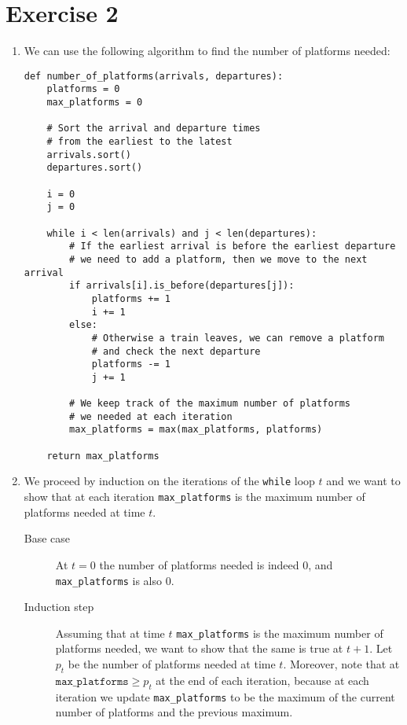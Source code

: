 \documentclass[10pt]{article}
\begin{document}
\section*{Exercise 2}
\begin{enumerate}
    \item We can use the following algorithm to find the number of platforms needed:

          \begin{verbatim}
def number_of_platforms(arrivals, departures):
    platforms = 0
    max_platforms = 0

    # Sort the arrival and departure times
    # from the earliest to the latest
    arrivals.sort()
    departures.sort()

    i = 0
    j = 0

    while i < len(arrivals) and j < len(departures):
        # If the earliest arrival is before the earliest departure
        # we need to add a platform, then we move to the next arrival
        if arrivals[i].is_before(departures[j]): 
            platforms += 1
            i += 1
        else:
            # Otherwise a train leaves, we can remove a platform
            # and check the next departure
            platforms -= 1
            j += 1

        # We keep track of the maximum number of platforms
        # we needed at each iteration
        max_platforms = max(max_platforms, platforms)
    
    return max_platforms
        \end{verbatim}

    \item
          We proceed by induction on the iterations of the \texttt{while} loop $t$ and we want to show that at each iteration \texttt{max\_platforms} is the maximum number of platforms needed at time $t$.

          \begin{description}
              \item[Base case] At $t = 0$ the number of platforms needed is indeed 0, and \texttt{max\_platforms} is also 0.
              \item[Induction step] Assuming that at time $t$ \texttt{max\_platforms} is the maximum number of platforms needed, we want to show that the same is true at $t + 1$.
                  Let $p_t$ be the number of platforms needed at time $t$.
                  Moreover, note that at $\texttt{max\_platforms} \geq p_t$ at the end of each iteration, because at each iteration we update \texttt{max\_platforms} to be the maximum of the current number of platforms and the previous maximum.


\end{description}
\end{enumerate}
\end{document}
